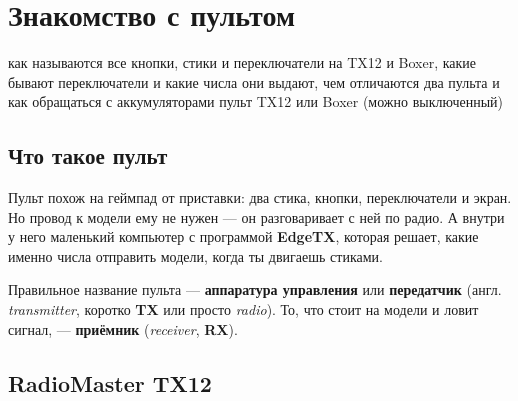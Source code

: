 \chapter{Знакомство с пультом}
\label{ch:hardware}
\chapterintro
  {как называются все кнопки, стики и переключатели на TX12 и Boxer, какие бывают
   переключатели и какие числа они выдают, чем отличаются два пульта и как обращаться
   с аккумуляторами}
  {пульт TX12 или Boxer (можно выключенный)}

\section{Что такое пульт}

\begin{simple}
Пульт похож на геймпад от приставки: два стика, кнопки, переключатели и экран. Но провод
к модели ему не нужен --- он разговаривает с ней по радио. А внутри у него маленький
компьютер с программой \textbf{EdgeTX}, которая решает, какие именно числа отправить модели,
когда ты двигаешь стиками.
\end{simple}

Правильное название пульта --- \textbf{аппаратура управления} или \textbf{передатчик}
(англ. \emph{transmitter}, коротко \textbf{TX} или просто \emph{radio}). То, что стоит на
модели и ловит сигнал, --- \textbf{приёмник} (\emph{receiver}, \textbf{RX}).

\section{RadioMaster TX12}

